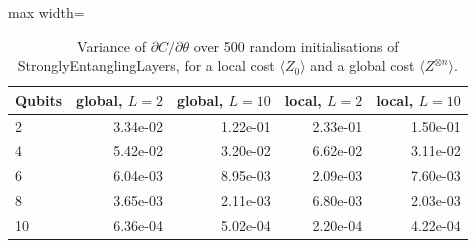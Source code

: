 \begin{table}[htbp]
\centering
\small
\caption{Variance of $\partial C/\partial\theta$ over 500 random initialisations of StronglyEntanglingLayers, for a local cost $\langle Z_0\rangle$ and a global cost $\langle Z^{\otimes n}\rangle$.}
\label{tab:barren}
\begin{adjustbox}{max width=\linewidth}
\begin{tabular}{lrrrr}
\toprule
Qubits & global, $L=2$ & global, $L=10$ & local, $L=2$ & local, $L=10$ \\
\midrule
2 & 3.34e-02 & 1.22e-01 & 2.33e-01 & 1.50e-01 \\
4 & 5.42e-02 & 3.20e-02 & 6.62e-02 & 3.11e-02 \\
6 & 6.04e-03 & 8.95e-03 & 2.09e-03 & 7.60e-03 \\
8 & 3.65e-03 & 2.11e-03 & 6.80e-03 & 2.03e-03 \\
10 & 6.36e-04 & 5.02e-04 & 2.20e-04 & 4.22e-04 \\
\bottomrule
\end{tabular}
\end{adjustbox}
\end{table}
